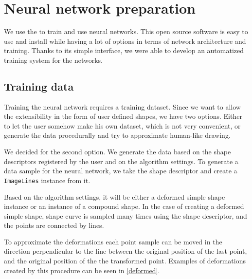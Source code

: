 \section{Neural network preparation}
We use the \citet{fann} to train and use neural networks. This open source software is easy to use and install while having a lot of options in terms of network architecture and training. Thanks to its simple interface, we were able to develop an automatized training system for the networks.

\subsection{Training data}
Training the neural network requires a training dataset. Since we want to allow the extensibility in the form of user defined shapes, we have two options. Either to let the user somehow make his own dataset, which is not very convenient, or generate the data procedurally and try to approximate human-like drawing.

We decided for the second option. We generate the data based on the shape descriptors registered by the user and on the algorithm settings. To generate a data sample for the neural network, we take the shape descriptor and create a \texttt{ImageLines} instance from it.

Based on the algorithm settings, it will be either a deformed simple shape instance or an instance of a compound shape. In the case of creating a deformed simple shape, shape curve is sampled many times using the shape descriptor, and the points are connected by lines.
 
To approximate the deformations each point sample can be moved in the direction perpendicular to the line between the original position of the last point, and the original position of the the transformed point. Examples of deformations created by this procedure can be seen in \cref{deformed}.

